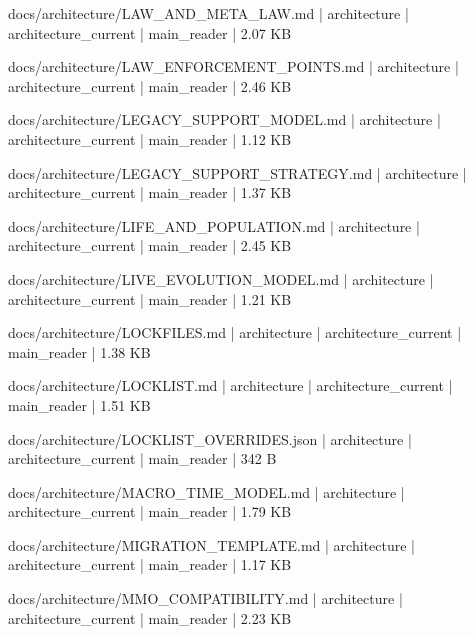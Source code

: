 \documentclass[11pt,a4paper]{report}
\begin{document}
{\small\ttfamily\raggedright docs/\allowbreak{}architecture/\allowbreak{}LAW\_AND\_META\_LAW.\allowbreak{}md | architecture | architecture\_current | main\_reader | 2.\allowbreak{}07 KB\par}
{\small\ttfamily\raggedright docs/\allowbreak{}architecture/\allowbreak{}LAW\_ENFORCEMENT\_POINTS.\allowbreak{}md | architecture | architecture\_current | main\_reader | 2.\allowbreak{}46 KB\par}
{\small\ttfamily\raggedright docs/\allowbreak{}architecture/\allowbreak{}LEGACY\_SUPPORT\_MODEL.\allowbreak{}md | architecture | architecture\_current | main\_reader | 1.\allowbreak{}12 KB\par}
{\small\ttfamily\raggedright docs/\allowbreak{}architecture/\allowbreak{}LEGACY\_SUPPORT\_STRATEGY.\allowbreak{}md | architecture | architecture\_current | main\_reader | 1.\allowbreak{}37 KB\par}
{\small\ttfamily\raggedright docs/\allowbreak{}architecture/\allowbreak{}LIFE\_AND\_POPULATION.\allowbreak{}md | architecture | architecture\_current | main\_reader | 2.\allowbreak{}45 KB\par}
{\small\ttfamily\raggedright docs/\allowbreak{}architecture/\allowbreak{}LIVE\_EVOLUTION\_MODEL.\allowbreak{}md | architecture | architecture\_current | main\_reader | 1.\allowbreak{}21 KB\par}
{\small\ttfamily\raggedright docs/\allowbreak{}architecture/\allowbreak{}LOCKFILES.\allowbreak{}md | architecture | architecture\_current | main\_reader | 1.\allowbreak{}38 KB\par}
{\small\ttfamily\raggedright docs/\allowbreak{}architecture/\allowbreak{}LOCKLIST.\allowbreak{}md | architecture | architecture\_current | main\_reader | 1.\allowbreak{}51 KB\par}
{\small\ttfamily\raggedright docs/\allowbreak{}architecture/\allowbreak{}LOCKLIST\_OVERRIDES.\allowbreak{}json | architecture | architecture\_current | main\_reader | 342 B\par}
{\small\ttfamily\raggedright docs/\allowbreak{}architecture/\allowbreak{}MACRO\_TIME\_MODEL.\allowbreak{}md | architecture | architecture\_current | main\_reader | 1.\allowbreak{}79 KB\par}
{\small\ttfamily\raggedright docs/\allowbreak{}architecture/\allowbreak{}MIGRATION\_TEMPLATE.\allowbreak{}md | architecture | architecture\_current | main\_reader | 1.\allowbreak{}17 KB\par}
{\small\ttfamily\raggedright docs/\allowbreak{}architecture/\allowbreak{}MMO\_COMPATIBILITY.\allowbreak{}md | architecture | architecture\_current | main\_reader | 2.\allowbreak{}23 KB\par}
\end{document}
